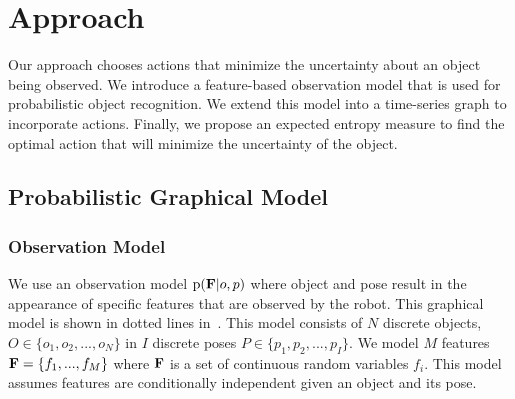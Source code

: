     \vspace{-0.5ex}
\section{Approach}
    \vspace{-0.5ex}


Our approach chooses actions that minimize the uncertainty about an object being observed. We introduce a feature-based observation model that is used for probabilistic object recognition. We extend this model into a time-series graph to incorporate actions. Finally, we propose an expected entropy measure to find the optimal action that will minimize the uncertainty of the object.
\vspace{-1ex}
    \subsection{Probabilistic Graphical Model}
    \vspace{-0.5ex}
            
        \subsubsection{Observation Model}
            We use an observation model $\text{p}(\mathbf{F}|o,p)$ where object and pose result in the appearance of specific features that are observed by the robot. This graphical model is shown in dotted lines in~. This model consists of $N$ discrete objects, $O \in \{o_1,o_2, ..., o_N\}$ in $I$ discrete poses $P \in \{p_1,p_2, ..., p_I\}$. We model $M$ features $\mathbf{F} = \left\{ f_1, ...,  f_M\right\}$ where $\mathbf{F}$ is a set of continuous random variables $f_i$. This model assumes features are conditionally independent given an object and its pose. 

